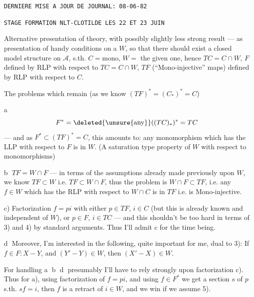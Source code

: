 \texttt{DERNIERE MISE A JOUR DE JOURNAL: 08-06-82}

\texttt{STAGE FORMATION NLT-CLOTILDE LES 22 ET 23 JUIN}


Alternative presentation of theory, with possibly slightly less strong result --- as presentation of handy  conditions on a $W$, so that there should exist a closed model structure on $\mathcal A$, s.th. $C=\text{mono}$, $W=$ the given one, hence $TC=C\cap W$, $F$ defined by  RLP with respect to $TC=C\cap W$,  $TF$ (``Mono-injective'' maps) defined by RLP with respect to $C$.

The problems which remain (as we know  $(TF)^*=(C_*)^*=C$)

\textcircled{a}
\[
F^*=\deleted{\unsure{\text{any}}}((TC)_*)^*=TC
\]
--- and as  $F^*\subset(TF)^*=C$, this amounts to: any monomorphism which has the LLP with respect to $F$ is in $W$. (A saturation type property of $W$ with respect to monomorphisms)

\textcircled{b} $TF=W\cap F$ --- in terms of the assumptions already made previously upon $W$, we know $TF\subset W$ i.e. $TF\subset W\cap F$, thus the problem is $W\cap F\subset TF$, i.e. any $f\in W$ which has the RLP with respect to $W\cap C$ is in $TF$ i.e. is Mono-injective.

c) Factorization $f=pi$ with either $p\in TF$, $i\in C$ (but this is already known and independent of $W$), or $p\in F$, $i\in TC$  --- and this shouldn't be too hard in terms of 3) and 4) by standard arguments. Thus I'll admit c for the time being.

\textcircled{d} Moreover, I'm interested in the following, quite important for me, dual to 3): If $f\in F:X-Y$, and $(Y'-Y)\in W$, then $(X'-X)\in W$.

For handling \textcircled{a} \textcircled{b} \textcircled{d} presumably I'll have to rely strongly upon factorization c). Thus for a), using factorization of $f=pi$, and using $f\in F^*$ we get a section $s$ of $p$  s.th. $sf=i$, then $f$ is a retract of $i\in W$, and we win if we assume 5).


